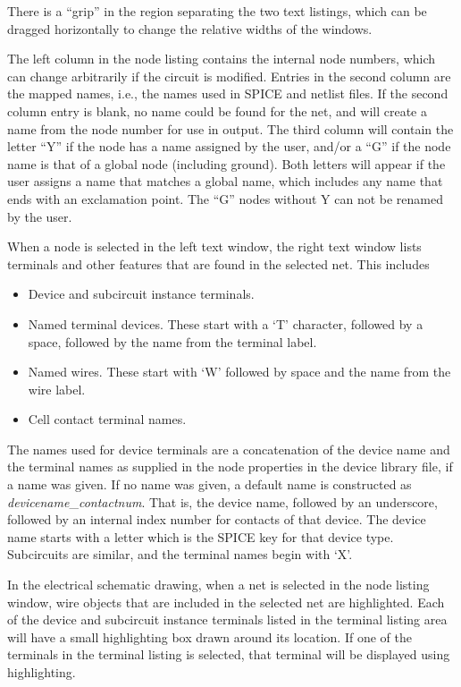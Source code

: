 There is a ``grip'' in the region separating the two text listings,
which can be dragged horizontally to change the relative widths of the
windows.

The left column in the node listing contains the internal node
numbers, which can change arbitrarily if the circuit is modified. 
Entries in the second column are the mapped names, i.e., the names
used in SPICE and netlist files.  If the second column entry is blank,
no name could be found for the net, and {\Xic} will create a name from
the node number for use in output.  The third column will contain the
letter ``{\vt Y}'' if the node has a name assigned by the user, and/or
a ``{\vt G}'' if the node name is that of a global node (including
ground).  Both letters will appear if the user assigns a name that
matches a global name, which includes any name that ends with an
exclamation point.  The ``{\vt G}'' nodes without {\vt Y} can not be
renamed by the user.

When a node is selected in the left text window, the right text
window lists terminals and other features that are found in the
selected net.  This includes
\begin{itemize}
\item{Device and subcircuit instance terminals.}
\item{Named terminal devices.  These start with a `{\vt T}' character,
followed by a space, followed by the name from the terminal
label.}
\item{Named wires.  These start with `{\vt W}' followed by space and
the name from the wire label.}
\item{Cell contact terminal names.}
\end{itemize}

The names used for device terminals are a concatenation of the device
name and the terminal names as supplied in the node properties in the
device library file, if a name was given.  If no name was given, a
default name is constructed as {\it devicename\/}\_{\it contactnum\/}. 
That is, the device name, followed by an underscore, followed by an
internal index number for contacts of that device.  The device name
starts with a letter which is the SPICE key for that device type. 
Subcircuits are similar, and the terminal names begin with `{\vt X}'.

In the electrical schematic drawing, when a net is selected in the
node listing window, wire objects that are included in the selected
net are highlighted.  Each of the device and subcircuit instance
terminals listed in the terminal listing area will have a small
highlighting box drawn around its location.  If one of the terminals
in the terminal listing is selected, that terminal will be displayed
using highlighting.


